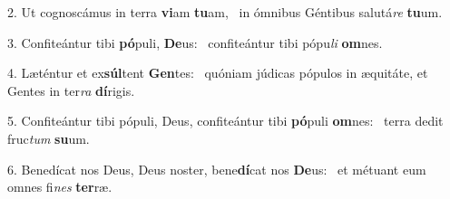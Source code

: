 2. Ut cognoscámus in terra \textbf{vi}am \textbf{tu}am, \ast\  in ómnibus Géntibus salutá\textit{re} \textbf{tu}um.\

3. Confiteántur tibi \textbf{pó}puli, \textbf{De}us: \ast\  confiteántur tibi pópu\textit{li} \textbf{om}nes.\

4. Læténtur et ex\textbf{súl}tent \textbf{Gen}tes: \ast\  quóniam júdicas pópulos in æquitáte, et Gentes in ter\textit{ra} \textbf{dí}rigis.\

5. Confiteántur tibi pópuli, Deus, confiteántur tibi \textbf{pó}puli \textbf{om}nes: \ast\  terra dedit fruc\textit{tum} \textbf{su}um.\

6. Benedícat nos Deus, Deus noster, bene\textbf{dí}cat nos \textbf{De}us: \ast\  et métuant eum omnes fi\textit{nes} \textbf{ter}ræ.\

